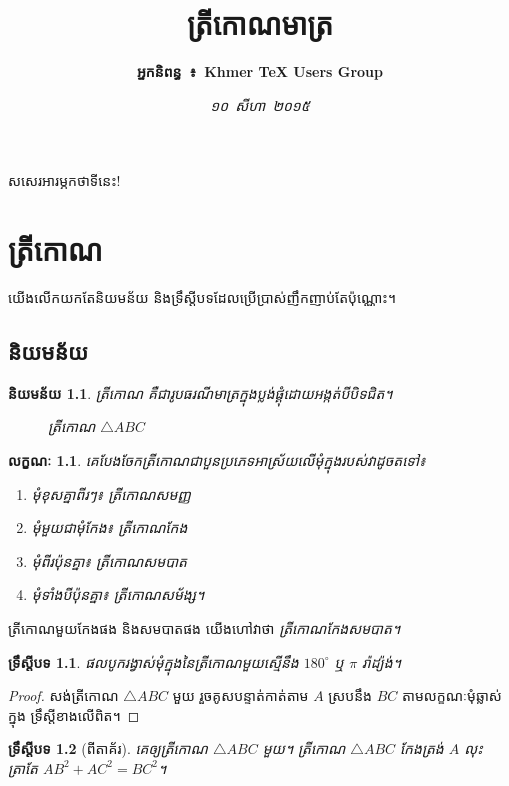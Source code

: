 \documentclass[a4paper,12pt,oneside]{book}
\title{\huge\bfseries ត្រីកោណមាត្រ}
\author{\bfseries អ្នកនិពន្ធ~៖~Khmer \TeX{} Users Group}
\date{\itshape ១០~សីហា~២០១៥}
\newtheorem{definition}{និយមន័យ}[chapter]
\newtheorem{theorem}{ទ្រឹស្ដីបទ}[chapter]
\newtheorem{property}{លក្ខណៈ}[chapter]
\begin{document}
	\frontmatter
	\maketitle
	\chapter*{\prefacename}
	សសេរអារម្ភកថាទីនេះ!
	\tableofcontents
	\listoftables
	\listoffigures
	\mainmatter
	\chapter{ត្រីកោណ}
	យើងលើកយកតែនិយមន័យ និងទ្រឹស្ដីបទដែលប្រើប្រាស់ញឹកញាប់តែប៉ុណ្ណោះ។
	\section{និយមន័យ}
	\begin{definition}
		\emph{ត្រីកោណ} គឺជារូបធរណីមាត្រក្នុងប្លង់ផ្គុំដោយអង្កត់បីបិទជិត។
		\begin{figure}[H]
			\centering
			\caption{ត្រីកោណ $ \triangle ABC $}
		\end{figure}
	\end{definition}
	\begin{property}
		គេបែងចែកត្រីកោណជាបួនប្រភេទអាស្រ័យលើមុំក្នុងរបស់វាដូចតទៅ៖
		\begin{multicols}{2}
			\begin{enumerate}
				\item មុំខុសគ្នាពីរៗ៖ \emph{ត្រីកោណសមញ្ញ}
				\item មុំមួយជាមុំកែង៖ \emph{ត្រីកោណកែង}
				\item មុំពីរប៉ុនគ្នា៖ \emph{ត្រីកោណសមបាត}
				\item មុំទាំងបីប៉ុនគ្នា៖ \emph{ត្រីកោណសម័ង្ស។}
			\end{enumerate}
		\end{multicols}
	\end{property}
	ត្រីកោណមួយកែងផង និងសមបាតផង យើងហៅវាថា \emph{ត្រីកោណកែងសមបាត។}
	\begin{theorem}
		ផលបូករង្វាស់មុំក្នុងនៃត្រីកោណមួយស្មើនឹង $ 180^\circ $ ឬ $ \pi $ រ៉ាដ្យ៉ង់។
	\end{theorem}
	\begin{proof}
		សង់ត្រីកោណ $ \triangle ABC $ មួយ រួចគូសបន្ទាត់កាត់តាម $ A $ ស្របនឹង $ BC $ តាមលក្ខណៈមុំឆ្លាស់ក្នុង ទ្រឹស្ដីខាងលើពិត។
	\end{proof}
	\begin{theorem}[ពីតាគ័រ]
		គេឲ្យត្រីកោណ $ \triangle ABC $ មួយ។ ត្រីកោណ $ \triangle ABC $ កែងត្រង់ $ A $ លុះត្រាតែ $ AB^2+AC^2=BC^2 $។
	\end{theorem}
\end{document}
